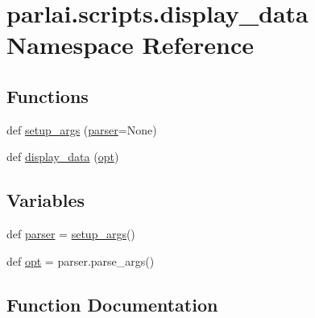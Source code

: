 \hypertarget{namespaceparlai_1_1scripts_1_1display__data}{}\section{parlai.\+scripts.\+display\+\_\+data Namespace Reference}
\label{namespaceparlai_1_1scripts_1_1display__data}
\subsection*{Functions}
\begin{DoxyCompactItemize}
\item 
def \hyperlink{namespaceparlai_1_1scripts_1_1display__data_a666e6177939b9a63961e56a1dfdc74b4}{setup\+\_\+args} (\hyperlink{namespaceparlai_1_1scripts_1_1display__data_a5fa87e5f2fd5df26d1eac44bd92cf31e}{parser}=None)
\item 
def \hyperlink{namespaceparlai_1_1scripts_1_1display__data_af47c3f49de57cd1a9397b88bf36a8213}{display\+\_\+data} (\hyperlink{namespaceparlai_1_1scripts_1_1display__data_ae32a1a88bf398939e558e8eb7d1cb94e}{opt})
\end{DoxyCompactItemize}
\subsection*{Variables}
\begin{DoxyCompactItemize}
\item 
def \hyperlink{namespaceparlai_1_1scripts_1_1display__data_a5fa87e5f2fd5df26d1eac44bd92cf31e}{parser} = \hyperlink{namespaceparlai_1_1scripts_1_1display__data_a666e6177939b9a63961e56a1dfdc74b4}{setup\+\_\+args}()
\item 
def \hyperlink{namespaceparlai_1_1scripts_1_1display__data_ae32a1a88bf398939e558e8eb7d1cb94e}{opt} = parser.\+parse\+\_\+args()
\end{DoxyCompactItemize}


\subsection{Function Documentation}
\mbox{\label{namespaceparlai_1_1scripts_1_1display__data_af47c3f49de57cd1a9397b88bf36a8213}} 
